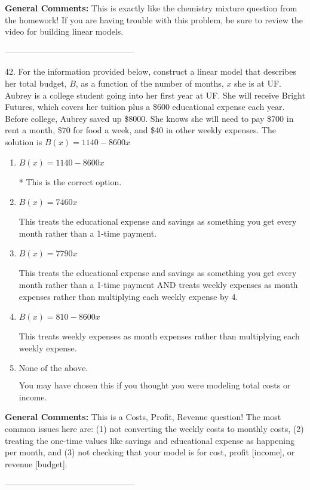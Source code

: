 \documentclass{extbook}[14pt]
\begin{document}
\textbf{General Comments:} This is exactly like the chemistry mixture question from the homework! If you are having trouble with this problem, be sure to review the video for building linear models.

-----------------------------------------------

42. For the information provided below, construct a linear model that describes her total budget, $B$, as a function of the number of months, $x$ she is at UF.
Aubrey is a college student going into her first year at UF. She will receive Bright Futures, which covers her tuition plus a \$600 educational expense each year. Before college, Aubrey saved up \$8000. She knows she will need to pay \$700 in rent a month, \$70 for food a week, and \$40 in other weekly expenses. 
The solution is $ B(x) = 1140 - 8600 x $ 

\begin{enumerate}[label=\Alph*.] 
\item $ B(x) = 1140 - 8600 x $ 

 * This is the correct option. 
\item $ B(x) = 7460 x $ 

 This treats the educational expense and savings as something you get every month rather than a 1-time payment. 
\item $ B(x) = 7790 x $ 

 This treats the educational expense and savings as something you get every month rather than a 1-time payment AND treats weekly expenses as month expenses rather than multiplying each weekly expense by 4. 
\item $ B(x) = 810 - 8600 x $ 

 This treats weekly expenses as month expenses rather than multiplying each weekly expense. 
\item $ \text{None of the above.} $ 

 You may have chosen this if you thought you were modeling total costs or income. 
\end{enumerate} 
 
\textbf{General Comments:} This is a Costs, Profit, Revenue question! The most common issues here are: (1) not converting the weekly costs to monthly costs, (2) treating the one-time values like savings and educational expense as happening per month, and (3) not checking that your model is for cost, profit [income], or revenue [budget].

-----------------------------------------------
\end{document}
